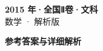 \documentclass[zihao=-4, a4paper]{ctexart}
\begin{document}
\begin{center}
  {\Large\bfseries 2015 年·全国Ⅱ卷·文科}\\[4pt]
  {\large 数学 · 解析版}
\end{center}
\medskip
{}

\clearpage
{}
\begin{center}{\Large\bfseries 参考答案与详细解析}\end{center}
\medskip

\end{document}
